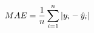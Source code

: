 \documentclass[preview]{standalone}
\begin{document}
\begin{align*}
\special{dvisvgm:raw <g id='unique000'>}MAE = \frac{1}{n}\sum_{i=1}^{n}|y_i - \hat{y}_i|\special{dvisvgm:raw </g>}
\end{align*}
\end{document}
